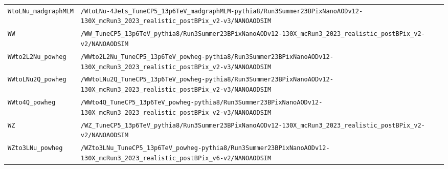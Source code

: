 \begin{longtable}{@{}>{\RaggedRight\arraybackslash}p{} >{\RaggedRight\arraybackslash}p{}@{}}
\addlinespace[2pt]
\texttt{WtoLNu\_\allowbreak{}madgraphMLM} & \texttt{/\allowbreak{}WtoLNu-\allowbreak{}4Jets\_\allowbreak{}TuneCP5\_\allowbreak{}13p6TeV\_\allowbreak{}madgraphMLM-\allowbreak{}pythia8/\allowbreak{}Run3Summer23BPixNanoAODv12-\allowbreak{}130X\_\allowbreak{}mcRun3\_\allowbreak{}2023\_\allowbreak{}realistic\_\allowbreak{}postBPix\_\allowbreak{}v2-\allowbreak{}v3/\allowbreak{}NANOAODSIM} \\
\addlinespace[2pt]
\texttt{WW} & \texttt{/\allowbreak{}WW\_\allowbreak{}TuneCP5\_\allowbreak{}13p6TeV\_\allowbreak{}pythia8/\allowbreak{}Run3Summer23BPixNanoAODv12-\allowbreak{}130X\_\allowbreak{}mcRun3\_\allowbreak{}2023\_\allowbreak{}realistic\_\allowbreak{}postBPix\_\allowbreak{}v2-\allowbreak{}v2/\allowbreak{}NANOAODSIM} \\
\addlinespace[2pt]
\texttt{WWto2L2Nu\_\allowbreak{}powheg} & \texttt{/\allowbreak{}WWto2L2Nu\_\allowbreak{}TuneCP5\_\allowbreak{}13p6TeV\_\allowbreak{}powheg-\allowbreak{}pythia8/\allowbreak{}Run3Summer23BPixNanoAODv12-\allowbreak{}130X\_\allowbreak{}mcRun3\_\allowbreak{}2023\_\allowbreak{}realistic\_\allowbreak{}postBPix\_\allowbreak{}v2-\allowbreak{}v3/\allowbreak{}NANOAODSIM} \\
\addlinespace[2pt]
\texttt{WWtoLNu2Q\_\allowbreak{}powheg} & \texttt{/\allowbreak{}WWtoLNu2Q\_\allowbreak{}TuneCP5\_\allowbreak{}13p6TeV\_\allowbreak{}powheg-\allowbreak{}pythia8/\allowbreak{}Run3Summer23BPixNanoAODv12-\allowbreak{}130X\_\allowbreak{}mcRun3\_\allowbreak{}2023\_\allowbreak{}realistic\_\allowbreak{}postBPix\_\allowbreak{}v2-\allowbreak{}v3/\allowbreak{}NANOAODSIM} \\
\addlinespace[2pt]
\texttt{WWto4Q\_\allowbreak{}powheg} & \texttt{/\allowbreak{}WWto4Q\_\allowbreak{}TuneCP5\_\allowbreak{}13p6TeV\_\allowbreak{}powheg-\allowbreak{}pythia8/\allowbreak{}Run3Summer23BPixNanoAODv12-\allowbreak{}130X\_\allowbreak{}mcRun3\_\allowbreak{}2023\_\allowbreak{}realistic\_\allowbreak{}postBPix\_\allowbreak{}v2-\allowbreak{}v3/\allowbreak{}NANOAODSIM} \\
\addlinespace[2pt]
\texttt{WZ} & \texttt{/\allowbreak{}WZ\_\allowbreak{}TuneCP5\_\allowbreak{}13p6TeV\_\allowbreak{}pythia8/\allowbreak{}Run3Summer23BPixNanoAODv12-\allowbreak{}130X\_\allowbreak{}mcRun3\_\allowbreak{}2023\_\allowbreak{}realistic\_\allowbreak{}postBPix\_\allowbreak{}v2-\allowbreak{}v2/\allowbreak{}NANOAODSIM} \\
\addlinespace[2pt]
\texttt{WZto3LNu\_\allowbreak{}powheg} & \texttt{/\allowbreak{}WZto3LNu\_\allowbreak{}TuneCP5\_\allowbreak{}13p6TeV\_\allowbreak{}powheg-\allowbreak{}pythia8/\allowbreak{}Run3Summer23BPixNanoAODv12-\allowbreak{}130X\_\allowbreak{}mcRun3\_\allowbreak{}2023\_\allowbreak{}realistic\_\allowbreak{}postBPix\_\allowbreak{}v6-\allowbreak{}v2/\allowbreak{}NANOAODSIM} \\

\end{longtable}
